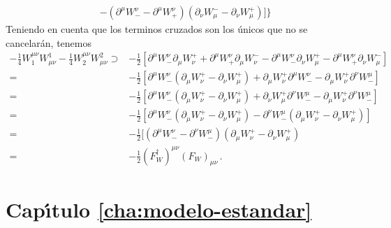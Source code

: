 \begin{itemize}
\begin{align}
&-(\partial^\mu W^\nu_--\partial^\mu W^\nu_+)(\partial_\nu W_\mu^--\partial_\nu W_\mu^+)]
\}
\end{align}
Teniendo en cuenta que los terminos cruzados son los \'unicos que no se cancelar\'an, tenemos
\begin{align}
 -\tfrac{1}{4}W^{\mu\nu}_1W_{\mu\nu}^1  -\tfrac{1}{4}W^{\mu\nu}_2W_{\mu\nu}^2\supset&
 -\tfrac{1}{2}[ \partial^\mu W^\nu_-\partial_\mu W_\nu^++\partial^\mu W^\nu_+\partial_\mu W_\nu^-
-\partial^\mu W^\nu_-\partial_\nu W_\mu^+-\partial^\mu W^\nu_+\partial_\nu W_\mu^-]\nonumber\\
=& -\tfrac{1}{2}[ \partial^\mu W^\nu_-(\partial_\mu W_\nu^+-\partial_\nu W_\mu^+)+\partial_\mu W_\nu^+\partial^\mu W^\nu_-
-\partial_\mu W_\nu^+\partial^\nu W^\mu_-]\nonumber\\
=& -\tfrac{1}{2}[ \partial^\mu W^\nu_-(\partial_\mu W_\nu^+-\partial_\nu W_\mu^+)+\partial_\nu W_\mu^+\partial^\nu W^\mu_-
-\partial_\mu W_\nu^+\partial^\nu W^\mu_-]\nonumber\\
=& -\tfrac{1}{2}[ \partial^\mu W^\nu_-(\partial_\mu W_\nu^+-\partial_\nu W_\mu^+)
-\partial^\nu W^\mu_-(\partial_\mu W_\nu^+-\partial_\nu W_\mu^+)]\nonumber\\
=& -\tfrac{1}{2}[ (\partial^\mu W^\nu_--\partial^\nu W^\mu_-)(\partial_\mu W_\nu^+-\partial_\nu W_\mu^+)\nonumber\\
=&-\frac{1}{2}(F^\dagger_W)^{\mu\nu}(F_W)_{\mu\nu}\,.
\end{align}


\end{itemize}

\section*{Cap\'\i tulo \ref{cha:modelo-estandar}}

